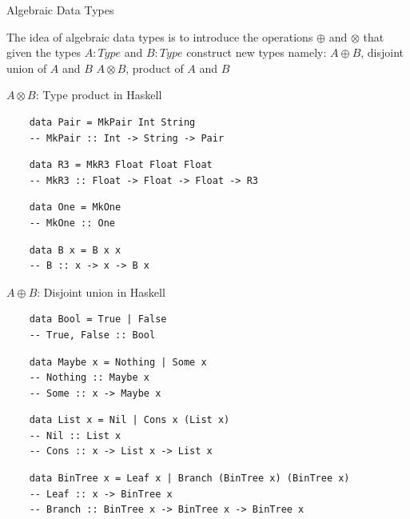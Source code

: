 \documentclass[pdf]{beamer}
\begin{document}
\begin{frame}{Algebraic Data Types}
  \begin{outline}
    \pause
    \1 The idea of algebraic data types is to introduce the operations $\oplus$ and $\otimes$ that
    given the types $A : Type$ and $B : Type$ construct new types namely:
    \pause
    \2 $A \oplus B$, disjoint union of $A$ and $B$
    \pause
    \2 $A \otimes B$, product of $A$ and $B$
  \end{outline}
\end{frame}

\begin{frame}[fragile]{$A \otimes B$: Type product in Haskell}
  \begin{verbatim}
    data Pair = MkPair Int String
    -- MkPair :: Int -> String -> Pair
  \end{verbatim}
  \pause
  \begin{verbatim}
    data R3 = MkR3 Float Float Float
    -- MkR3 :: Float -> Float -> Float -> R3
  \end{verbatim}
  \pause
  \begin{verbatim}
    data One = MkOne
    -- MkOne :: One
  \end{verbatim}
  \pause
  \begin{verbatim}
    data B x = B x x
    -- B :: x -> x -> B x
  \end{verbatim}
\end{frame}

\begin{frame}[fragile]{$A \oplus B$: Disjoint union in Haskell}
  \begin{verbatim}
    data Bool = True | False
    -- True, False :: Bool
  \end{verbatim}
  \pause
  \begin{verbatim}
    data Maybe x = Nothing | Some x
    -- Nothing :: Maybe x
    -- Some :: x -> Maybe x
  \end{verbatim}
  \pause
  \begin{verbatim}
    data List x = Nil | Cons x (List x)
    -- Nil :: List x
    -- Cons :: x -> List x -> List x
  \end{verbatim}
  \pause
  \begin{verbatim}
    data BinTree x = Leaf x | Branch (BinTree x) (BinTree x)
    -- Leaf :: x -> BinTree x
    -- Branch :: BinTree x -> BinTree x -> BinTree x
  \end{verbatim}
\end{frame}
\end{document}
